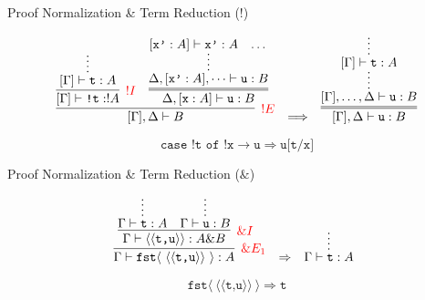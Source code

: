 \documentclass{beamer}
\newcommand{\term}[1]{\texttt{#1}}
\newcommand{\lin}[1]{\langle#1\rangle}
\newcommand{\lint}[1]{[#1]}
\begin{document}
\begin{frame}{Proof Normalization \& Term Reduction ($!$)}
	\small 
	
	\[
		\begin{array}{ccc}
		\infer[\textcolor{red}{! E}]{\lint{\Gamma}, \Delta \vdash B}{
			\infer[\textcolor{red}{!I}]{\lint{\Gamma} \vdash \term{!t}: !A}{
				\infer*[]{\lint{\Gamma} \vdash \term{t}: A}{}			
			}
			&
			\infer={\Delta, \lint{\term{x}: A} \vdash \term{u}: B}{
				\infer*[]{\Delta, \lint{\term{x'}: A}, \dots \vdash \term{u}: B}{
					\lint{\term{x'}: A} \vdash \term{x'}: A
					&
					\dots
				}
			}
		}
		&
		\Longrightarrow
		&
		\infer={\lint{\Gamma}, \Delta \vdash \term{u}: B}{
			\infer*{\lint{\Gamma}, \dots, \Delta \vdash \term{u}: B}{
				\infer*{\lint{\Gamma} \vdash \term{t}: A}{}
			}
		}
		\end{array}
	\]	
	
	\alert{
	\[
		\term{case !t of !x}\to\term{u} \Longrightarrow \term{u[t/x]}
	\]
	}
\end{frame}

\begin{frame}{Proof Normalization \& Term Reduction ($\&$)}
	\small 
	
	\[
		\begin{array}[t]{@{}ccc}
			\infer[\textcolor{red}{\&E_1}]{\Gamma \vdash \term{fst}\lin{~\lin{\lin{\term{t,u}}}~}: A}{
				\infer[\textcolor{red}{\&I}]{\Gamma \vdash \lin{\lin{\term{t,u}}}: A\& B}{
				\infer*{\Gamma \vdash \term{t}: A}{}
				&
				\infer*{\Gamma \vdash \term{u}: B}{}
				}
			}		
			&
			\Rightarrow
			&
			\infer*{\Gamma \vdash \term{t}: A}{}
		\end{array}
	\]	
	
	\alert{
	\[
		\term{fst}\lin{~\lin{\lin{\term{t,u}}}~} \Longrightarrow \term{t}
	\]
	}
\end{frame}
\end{document}
